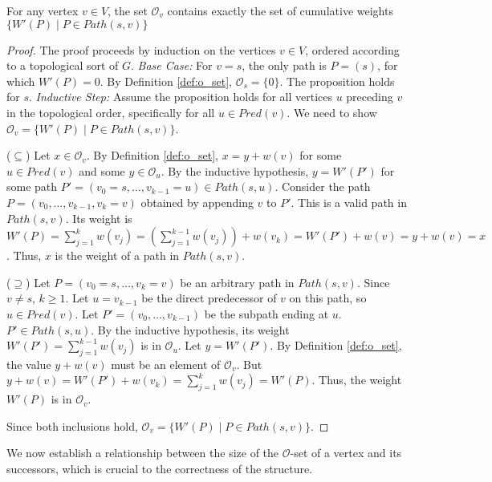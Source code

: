 \begin{proposition}
    \label{prop:o_set_correctness}
    For any vertex $v \in V$, the set $\mathcal{O}_v$ contains exactly the set of cumulative weights $\{ W'(P) \mid P \in Path(s, v) \}$
\end{proposition}
\begin{proof}
    The proof proceeds by induction on the vertices $v \in V$, ordered according to a topological sort of $G$.
    \textit{Base Case:} For $v=s$, the only path is $P=(s)$, for which $W'(P)=0$. By Definition \ref{def:o_set}, $\mathcal{O}_s = \{0\}$. The proposition holds for $s$.
    \textit{Inductive Step:} Assume the proposition holds for all vertices $u$ preceding $v$ in the topological order, specifically for all $u \in Pred(v)$. We need to show $\mathcal{O}_v = \{ W'(P) \mid P \in Path(s, v) \}$.

    ($\subseteq$) Let $x \in \mathcal{O}_v$. By Definition \ref{def:o_set}, $x = y + w(v)$ for some $u \in Pred(v)$ and some $y \in \mathcal{O}_u$. By the inductive hypothesis, $y = W'(P')$ for some path $P' = (v_0=s, \dots, v_{k-1}=u) \in Path(s, u)$. Consider the path $P = (v_0, \dots, v_{k-1}, v_k=v)$ obtained by appending $v$ to $P'$. This is a valid path in $Path(s, v)$. Its weight is $W'(P) = \sum_{j=1}^{k} w(v_j) = (\sum_{j=1}^{k-1} w(v_j)) + w(v_k) = W'(P') + w(v) = y + w(v) = x$. Thus, $x$ is the weight of a path in $Path(s, v)$.

    ($\supseteq$) Let $P = (v_0=s, \dots, v_k=v)$ be an arbitrary path in $Path(s, v)$. Since $v \neq s$, $k \ge 1$. Let $u = v_{k-1}$ be the direct predecessor of $v$ on this path, so $u \in Pred(v)$. Let $P' = (v_0, \dots, v_{k-1})$ be the subpath ending at $u$. $P' \in Path(s, u)$. By the inductive hypothesis, its weight $W'(P') = \sum_{j=1}^{k-1} w(v_j)$ is in $\mathcal{O}_u$. Let $y = W'(P')$. By Definition \ref{def:o_set}, the value $y + w(v)$ must be an element of $\mathcal{O}_v$. But $y + w(v) = W'(P') + w(v_k) = \sum_{j=1}^{k} w(v_j) = W'(P)$. Thus, the weight $W'(P)$ is in $\mathcal{O}_v$.

    Since both inclusions hold, $\mathcal{O}_v = \{ W'(P) \mid P \in Path(s, v) \}$.
\end{proof}

We now establish a relationship between the size of the $\mathcal{O}$-set of a vertex and its successors, which is crucial to the correctness of the structure.

